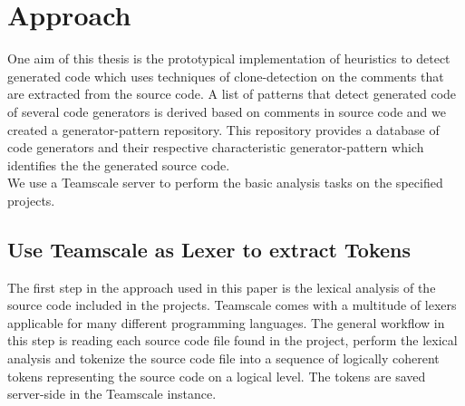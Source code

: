 
\chapter{Approach}\label{chapter:approach}
One aim of this thesis is the prototypical implementation of heuristics to detect generated code which uses techniques of clone-detection on the comments that are extracted from the source code. A list of patterns that detect generated code of several code generators is derived based on comments in source code and we created a generator-pattern repository. This repository provides a database of code generators and their respective characteristic generator-pattern which identifies the the generated source code.\\
We use a Teamscale server to perform the basic analysis tasks on the specified projects.
\section{Use Teamscale as Lexer to extract Tokens}
The first step in the approach used in this paper is the lexical analysis of the source code included in the projects. Teamscale comes with a multitude of lexers applicable for many different programming languages. The general workflow in this step is reading each source code file found in the project, perform the lexical analysis and tokenize the source code file into a sequence of logically coherent tokens representing the source code on a logical level. The tokens are saved server-side in the Teamscale instance.


